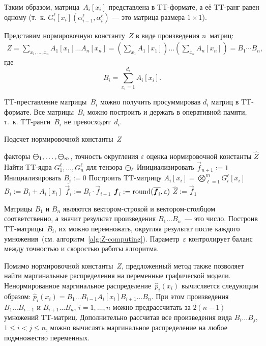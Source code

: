 Таким образом, матрица~$A_i[x_i]$ представлена в TT\hyp{}формате, а её TT\hyp{}ранг равен одному (т.~к. $G^{\ell}_i[x_i](\alpha^{\ell}_{i - 1}, \alpha^{\ell}_i)$ --- это матрица размера $1 \times 1$).

Представим нормировочную константу~$Z$ в виде произведения $n$~матриц:
\begin{multline*}
Z = \sum_{x_1, \dots, x_n}  A_1[x_1] \ldots  A_n[x_n]
= \left ( \sum_{x_1} A_1[x_1] \right ) \ldots  \left ( \sum_{x_n} A_n[x_n] \right ) = B_1 \dotsm  B_n,
\end{multline*}
где
\begin{equation*}
B_i = \sum_{x_i = 1}^{d_i} A_i[x_i].
\end{equation*}

TT\hyp{}преставление матрицы~$B_i$ можно получить просуммировав $d_i$ матриц в TT\hyp{}формате. Все матрицы~$B_i$ можно построить и держать в оперативной памяти, т.~к. TT\hyp{}ранги~$B_i$ не превосходят~$d_i$.

\begin{algorithm}[tb]
   \caption{Подсчет нормировочной константы~$Z$}
   \label{alg:Z-computing}
\begin{algorithmic}[1]
   \REQUIRE факторы $\boldsymbol{\mathcal{\Psi}}_1, \dots, \boldsymbol{\mathcal{\Psi}}_m$, точность округления $\varepsilon$
   \ENSURE оценка нормировочной константы $\widehat{Z}$
   \STATE Найти TT\hyp{}ядра $G^{\ell}_1, \dots, G^{\ell}_n$ для тензора $\boldsymbol{\mathcal{\Psi}}_{\ell}$
   \ENDFOR
   \STATE Инициализировать $\vec{f}_{n + 1} := 1$
     \STATE Инициализировать $B_i := 0$
       \STATE Построить TT\hyp{}матрицу $A_i[x_i] = \bigotimes_{\ell = 1}^m G^\ell_i[x_i]$
       \STATE $B_i := B_i + A_i[x_i]$
     \ENDFOR
     \STATE $\overline{\vec{f}_i} := B_i \cdot \vec{f}_{i + 1}$
     \STATE $\boldsymbol{f}_i := \operatorname{round}(\overline{\boldsymbol{f}_i}, \upvarepsilon)$
   \ENDFOR
   \STATE $\widehat{Z} := \vec{f}_1$
\end{algorithmic}
\end{algorithm}

Матрицы $B_1$ и $B_n$ являются вектором-строкой и вектором-столбцом соответственно, а значит результат произведения $B_1 \ldots B_n$~--- это число.
Построив TT\hyp{}матрицы~$B_i$, их можно перемножать, округляя результат после каждого умножения~(см. алгоритм~\ref{alg:Z-computing}). Параметр~$\varepsilon$ контролирует баланс между точностью и скоростью работы алгоритма.

Помимо нормировочной константы~$Z$, предложенный метод также позволяет найти маргинальные распределения на переменные графической модели. Ненормированное маргинальное распределение~$\hat{p}_i(x_i)$ вычисляется следующим образом:
$
\hat{p}_i(x_i) = B_1\ldots B_{i-1} A_i[x_i] B_{i+1}\ldots B_{n}.
$
При этом произведения~$B_1\ldots B_{i-1}$ и $B_{i+1}\ldots B_{n}$, $i=1,\ldots,n$ можно предрассчитать за $2 (n - 1)$ умножений TT\hyp{}матриц. Дополнительно рассчитав все произведения вида $B_i\ldots B_j$, $1 \leq i < j \leq n$, можно вычислять маргинальное распределение на любое подмножество переменных.

